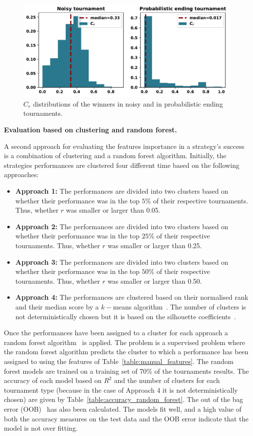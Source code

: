 \documentclass{article}
\begin{document}
\begin{figure}[!htbp]
    \centering
    \includegraphics[width=.65\textwidth]{../images/c_r_winners_tournaments.pdf}
    \caption{$C_r$ distributions of the winners in noisy and in probabilistic
    ending tournaments.}\label{fig:c_r_distributions}
\end{figure}

\textbf{Evaluation based on clustering and random forest.}

A second approach for evaluating the features importance in a strategy's success
is a combination of clustering and a random forest algorithm. Initially,
the strategies performances are clustered four different time based on the
following approaches:

\begin{itemize}
    \item \textbf{Approach 1:} The performances are divided into two clusters based
    on whether their performance was in the top \(5\%\) of their respective tournaments.
    Thus, whether \(r\) was smaller or larger than 0.05.
    \item \textbf{Approach 2:} The performances are divided into two clusters based
    on whether their performance was in the top \(25\%\) of their respective tournaments.
    Thus, whether \(r\) was smaller or larger than 0.25.
    \item \textbf{Approach 3:} The performances are divided into two clusters based
    on whether their performance was in the top \(50\%\) of their respective tournaments.
    Thus, whether \(r\) was smaller or larger than 0.50.
    \item \textbf{Approach 4:} The performances are clustered based on their normalised rank and
    their median score by a \(k-\)means algorithm~\cite{Arthur2007}. The number of
    clusters is not deterministically chosen but it is based on the silhouette
    coefficients~\cite{Rousseeuw1987}.
\end{itemize}

Once the performances have been assigned to a cluster for each approach a
random forest algorithm~\cite{breiman2001} is applied. The problem is a supervised
problem where the random forest algorithm predicts the cluster to which a performance
has been assigned to using the features of Table~\ref{table:manual_features}.
The random
forest models are trained on a training set of 70\% of the tournaments results.
The accuracy of each model based on $R^2$ and the number of clusters for each
tournament type (because in the case of Approach 4 it is not
deterministically chosen) are given by Table~\ref{table:accuracy_random_forest}.
The out of the bag error (OOB)~\cite{hastie2005} has also been calculated. The
models fit well, and a high value of both the accuracy measures on the test data
and the OOB error indicate that the model is not over fitting.
\end{document}
